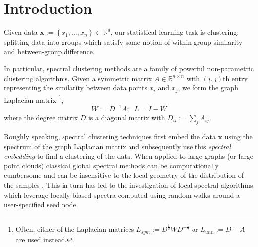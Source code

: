 \documentclass{article}
\newcommand{\set}[1]{\left\{#1\right\}}
\newcommand{\Reals}{\mathbb{R}}
\newcommand{\Rd}{\Reals^d}
\newcommand{\x}{\mathbf{x}}
\newcommand{\1}{\mathbf{1}}
\theoremstyle{aldenthm}
\theoremstyle{remark}
\begin{document}

\printAffiliationsAndNotice{} %

\begin{abstract}
\end{abstract}

\section{Introduction}
\label{introduction}

Given data $\mathbf{x} := \set{x_1, \ldots, x_n} \subset \Rd$, our statistical learning task is clustering: splitting data into groups which satisfy some notion of within-group similarity and between-group difference. 

In particular, spectral clustering methods are a family of powerful non-parametric clustering algorithms. Given a symmetric matrix $A \in \Reals^{n \times n}$ with $(i,j)$th entry representing the similarity between data points $x_i$ and $x_j$, we form the graph Laplacian matrix \footnote{Often, either of the Laplacian matrices  $L_{sym} := D^{\frac{1}{2}}WD^{-\frac{1}{2}}$ or $L_{unn} := D - A$ are used instead.},
\begin{equation}
\label{eqn: random_walk_laplacian}
W := D^{-1}A; ~~~ L = I - W
\end{equation}
where the degree matrix $D$ is a diagonal matrix with $D_{ii} := \sum_j A_{ij}$.

Roughly speaking, spectral clustering techniques first embed the data $\x$ using the spectrum of the graph Laplacian matrix and subsequently 
use this \emph{spectral embedding} to find a clustering of the data.
When applied to large graphs (or large point clouds) classical global spectral 
methods can be computationally cumbersome and 
can be insensitive to the local geometry of the distribution of the samples
\citep{mahoney2012,leskovec2010}.
This in turn has led to the investigation of local spectral algorithms \citep{spielman2013,anderson2006,leskovec2010}
which leverage locally-biased spectra computed using random walks around 
a user-specified seed node. 
\end{document}
